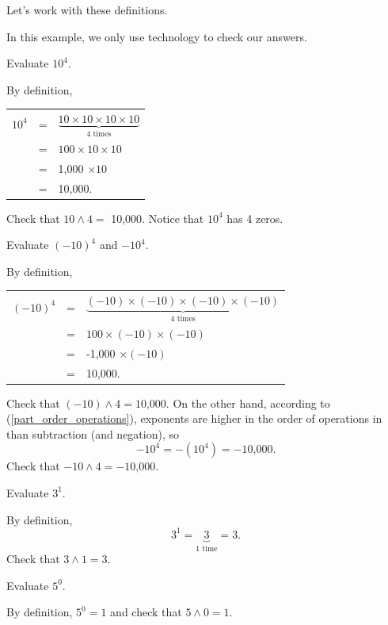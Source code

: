 Let's work with these definitions.

\begin{exam} 
\label{exam_exponential notation}
    In this example, we only use technology to check our answers.
    \begin{apart}
        \item Evaluate $10^4$. 
            \begin{soln}
                By definition, 
                \begin{center}
                    \begin{tabular}{lll}
                       $10^4$ &=& $\underbrace{10 \times 10 \times 10 \times 10}_{4 \text{ times}}$ \\
                       &=& $100 \times 10 \times 10 $ \\
                       &=& 1,000 $\times 10$ \\
                       &=& 10,000. \\    
                   \end{tabular}
                \end{center}
               Check that $10 \land 4 =$ 10,000.  Notice that $10^4$ has 4 zeros.
            \end{soln}  
        \item Evaluate $(-10)^4$ and $-10^4$.
            \begin{soln}
                By definition, 
                \begin{center}
                    \begin{tabular}{lll}
                       $(-10)^4$ &=& $\underbrace{(-10) \times (-10) \times (-10) \times (-10)}_{4 \text{ times}}$ \\
                       &=& $100 \times (-10) \times (-10) $ \\
                       &=& -1,000 $\times (-10)$ \\
                       &=& 10,000. \\    
                   \end{tabular}
                \end{center}
                Check that $(-10) \land 4 = \text{10,000}$.
                On the other hand, according to  (\ref{part_order_operations}), exponents are higher in the order of operations in  than subtraction (and negation), so 
                    $$-10^4=-(10^4)=-\text{10,000}.$$
                Check that $-10 \land 4 = -\text{10,000}$.
            \end{soln}
        \item Evaluate $3^1$. 
             \begin{soln}               
                 By definition, $$3^1 = \underbrace{3}_{1 \text{ time}} = 3.$$
                Check that $3 \land 1 = 3.$
            \end{soln}
        \item Evaluate $5^0$.
            \begin{soln}
                By definition, $5^0 =1$ and check that $5 \land 0 =1$. 
            \end{soln}


\end{apart}
\end{exam}

